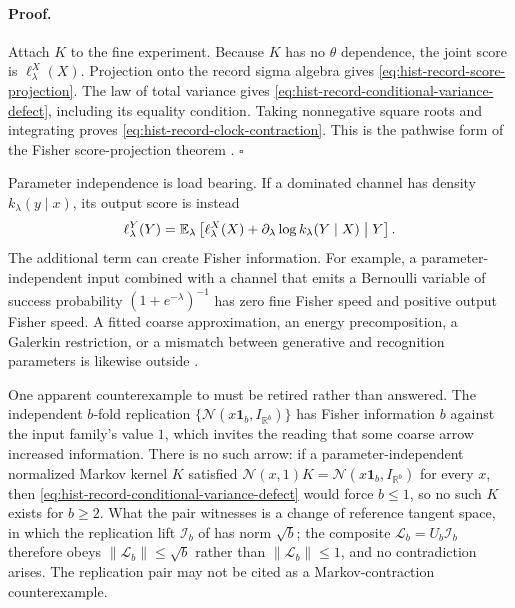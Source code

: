 \paragraph{Proof.}
Attach $K$ to the fine experiment.  Because $K$ has no $\theta$ dependence,
the joint score is $\ell^X_\lambda(X)$.  Projection onto the record sigma
algebra gives \eqref{eq:hist-record-score-projection}.  The law of total
variance gives \eqref{eq:hist-record-conditional-variance-defect}, including
its equality condition.  Taking nonnegative square roots and integrating
proves \eqref{eq:hist-record-clock-contraction}.  This is the pathwise form
of the Fisher score-projection theorem
\citep{AyJostLeSchwachhoefer2018}.  $\square$

Parameter independence is load bearing.  If a dominated channel has density
$k_\lambda(y\mid x)$, its output score is instead
\begin{equation}
\ell^Y_\lambda(Y)
=\mathbb E_\lambda\left[
\ell^X_\lambda(X)
+\partial_\lambda\log k_\lambda(Y\mid X)
\mathrel{\big|}Y
\right].
\label{eq:hist-parameter-dependent-channel-score}
\end{equation}
The additional term can create Fisher information.  For example, a
parameter-independent input combined with a channel that emits a
Bernoulli variable of success probability
$(1+e^{-\lambda})^{-1}$ has zero fine Fisher speed and positive output Fisher
speed.  A fitted coarse approximation, an energy precomposition, a Galerkin
restriction, or a mismatch between generative and recognition parameters is
likewise outside
.  

One apparent counterexample to  must be
retired rather than answered.  The independent $b$-fold replication
$\{\mathcal N(x\mathbf 1_b,I_{\mathbb R^b})\}$ has Fisher information $b$ against the input
family's value $1$, which invites the reading that some coarse arrow increased
information.  There is no such arrow: if a parameter-independent normalized
Markov kernel $K$ satisfied $\mathcal N(x,1)K=\mathcal N(x\mathbf 1_b,I_{\mathbb R^b})$ for
every $x$, then \eqref{eq:hist-record-conditional-variance-defect} would force
$b\leq1$, so no such $K$ exists for $b\geq2$.  What the pair witnesses is a
change of reference tangent space, in which the replication lift
$\mathscr I_b$ of  has norm $\sqrt b$; the
composite $\mathscr L_b=U_b\mathscr I_b$ therefore obeys
$\lVert\mathscr L_b\rVert\leq\sqrt b$ rather than
$\lVert\mathscr L_b\rVert\leq1$, and no contradiction arises.  The replication
pair may not be cited as a Markov-contraction counterexample.

